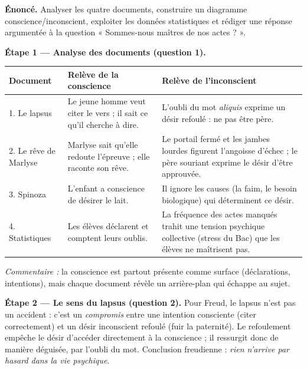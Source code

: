 \documentclass[11pt]{article}
\newcounter{popsec}
\newcounter{popsub}
\newcommand{\courssub}[1]{%
  \stepcounter{popsub}%
  \par\vspace{9pt}\noindent{\popxbold\fontsize{11.5}{13}\selectfont\color{popink}{\color{poporange}\thepopsec.\thepopsub}\hspace{6pt}#1}\par\nopagebreak\vspace{4pt}
}
\begin{document}
\courssub{Démarche et corrigé commenté}

\begin{exoresolu}
\textbf{Énoncé.} Analyser les quatre documents, construire un diagramme conscience/inconscient, exploiter les données statistiques et rédiger une réponse argumentée à la question « Sommes-nous maîtres de nos actes ? ».

\tcblower

\textbf{Étape 1 — Analyse des documents (question 1).}

\begin{center}
\begin{tabularx}{\linewidth}{|l|X|X|}\hline
\rowcolor{popblueL} \textbf{Document} & \textbf{Relève de la conscience} & \textbf{Relève de l'inconscient} \\ \hline
1. Le lapsus & Le jeune homme veut citer le vers ; il sait ce qu'il cherche à dire. & L'oubli du mot \emph{aliquis} exprime un désir refoulé : ne pas être père. \\ \hline
2. Le rêve de Marlyse & Marlyse sait qu'elle redoute l'épreuve ; elle raconte son rêve. & Le portail fermé et les jambes lourdes figurent l'angoisse d'échec ; le père souriant exprime le désir d'être approuvée. \\ \hline
3. Spinoza & L'enfant a conscience de désirer le lait. & Il ignore les causes (la faim, le besoin biologique) qui déterminent ce désir. \\ \hline
4. Statistiques & Les élèves déclarent et comptent leurs oublis. & La fréquence des actes manqués trahit une tension psychique collective (stress du Bac) que les élèves ne maîtrisent pas. \\ \hline
\end{tabularx}
\end{center}

\emph{Commentaire :} la conscience est partout présente comme surface (déclarations, intentions), mais chaque document révèle un arrière-plan qui échappe au sujet.

\textbf{Étape 2 — Le sens du lapsus (question 2).} Pour Freud, le lapsus n'est pas un accident : c'est un \emph{compromis} entre une intention consciente (citer correctement) et un désir inconscient refoulé (fuir la paternité). Le refoulement empêche le désir d'accéder directement à la conscience ; il ressurgit donc de manière déguisée, par l'oubli du mot. Conclusion freudienne : \emph{rien n'arrive par hasard dans la vie psychique}.


\end{exoresolu}
\end{document}
